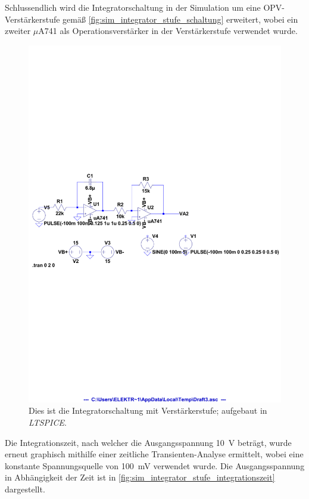 \documentclass[12pt,english,ngerman]{scrartcl}
\begin{document}
Schlussendlich wird die Integratorschaltung in der Simulation um eine
OPV-Verstärkerstufe gemäß \autoref{fig:sim_integrator_stufe_schaltung}
erweitert, wobei ein zweiter $\mu$A741 als Operationsverstärker in der
Verstärkerstufe verwendet wurde.

\begin{figure}[H]
  \centering
    \includegraphics[width=\linewidth]{./figures/integrator/sim/mit_stufe/schaltung_spannungstypen.pdf}
  \caption{Dies ist die Integratorschaltung mit Verstärkerstufe; aufgebaut in \textit{LTSPICE}.}
  \label{fig:sim_integrator_stufe_schaltung}
\end{figure}

Die Integrationszeit, nach welcher die Ausgangsspannung \SI{10}{\volt} beträgt,
wurde erneut graphisch mithilfe einer zeitliche Transienten-Analyse ermittelt,
wobei eine konstante Spannungsquelle von \SI{100}{\milli\volt} verwendet wurde.
Die Ausgangsspannung in Abhängigkeit der Zeit ist in
\autoref{fig:sim_integrator_stufe_integrationszeit} dargestellt.
\end{document}
